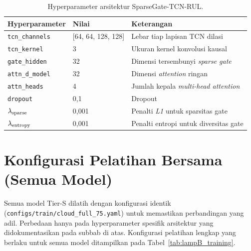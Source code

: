 \begin{table}[ht]
  \centering
  \caption{Hyperparameter arsitektur SparseGate-TCN-RUL.}
  \label{tab:lampB_sparsegate_arch}
  \small
  \begin{tabular}{@{}lll@{}}
    \toprule
    \textbf{Hyperparameter} & \textbf{Nilai} & \textbf{Keterangan} \\
    \midrule
    \texttt{tcn\_channels} & [64, 64, 128, 128] & Lebar tiap lapisan TCN dilasi \\
    \texttt{tcn\_kernel} & 3 & Ukuran kernel konvolusi kausal \\
    \texttt{gate\_hidden} & 32 & Dimensi tersembunyi \emph{sparse gate} \\
    \texttt{attn\_d\_model} & 32 & Dimensi \emph{attention} ringan \\
    \texttt{attn\_heads} & 4 & Jumlah kepala \emph{multi-head attention} \\
    \texttt{dropout} & 0,1 & Dropout \\
    $\lambda_{\rm sparse}$ & 0,001 & Penalti \emph{L1} untuk sparsitas gate \\
    $\lambda_{\rm entropy}$ & 0,001 & Penalti entropi untuk diversitas gate \\
    \bottomrule
  \end{tabular}
\end{table}

\section{Konfigurasi Pelatihan Bersama (Semua Model)}
\label{lamp:hparam_training}

Semua model Tier-S dilatih dengan konfigurasi identik
(\texttt{configs/\allowbreak train/\allowbreak cloud\_full\_75.yaml})
untuk memastikan perbandingan yang adil. Perbedaan hanya pada
hyperparameter spesifik arsitektur yang didokumentasikan pada subbab
di atas.
Konfigurasi pelatihan lengkap yang berlaku untuk semua model ditampilkan
pada Tabel~\ref{tab:lampB_training}.

